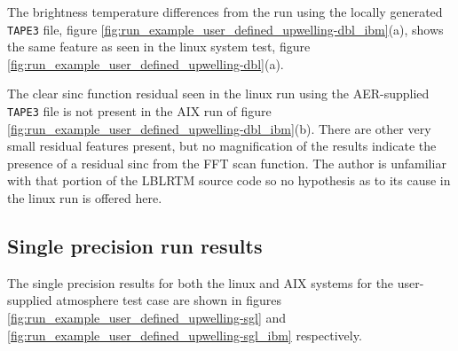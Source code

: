 The brightness temperature differences from the run using the locally generated \texttt{TAPE3} file, figure \ref{fig:run_example_user_defined_upwelling-dbl_ibm}(a), shows the same feature as seen in  the linux system test, figure \ref{fig:run_example_user_defined_upwelling-dbl}(a).

The clear sinc function residual seen in the linux run using the AER-supplied \texttt{TAPE3} file is not present in the AIX run of figure \ref{fig:run_example_user_defined_upwelling-dbl_ibm}(b). There are other very small residual features present, but no magnification of the results indicate the presence of a residual sinc from the FFT scan function. The author is unfamiliar with that portion of the LBLRTM source code so no hypothesis as to its cause in the linux run is offered here.


\subsection{Single precision run results}

The single precision results for both the linux and AIX systems for the user-supplied atmosphere test case are shown in figures \ref{fig:run_example_user_defined_upwelling-sgl} and \ref{fig:run_example_user_defined_upwelling-sgl_ibm} respectively.

